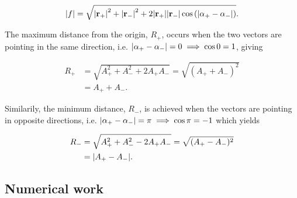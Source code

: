 \begin{equation}\label{eq:p3_magnitude_f}
    \abs{f} = \sqrt{\abs{\mathbf{r}_+}^2 + \abs{\mathbf{r}_-}^2 + 2\abs{\mathbf{r}_+}\abs{\mathbf{r_-}}\cos{(\abs{\alpha_+-\alpha_-})}}.
\end{equation}

The maximum distance from the origin, $R_+$, occurs when the two vectors are pointing in the same direction, i.e. $\abs{\alpha_+-\alpha_-} = 0 \implies \cos0=1$, giving 


\begin{align}
    R_+ &= \sqrt{A_+^2 + A_-^2 + 2A_+A_-} = \sqrt{(A_+ + A_-)^2}\nonumber \\
    &= A_+ + A_-. \label{eq:p4_Rplus}   
\end{align}

Similarily, the minimum distance, $R_-$, is achieved when the vectors are pointing in opposite directions, i.e. $\abs{\alpha_+-\alpha_-} = \pi \implies \cos\pi=-1$ which yields

 
\begin{align}
    R_- &= \sqrt{A_+^2 + A_-^2 - 2A_+A_-} = \sqrt{(A_+ - A_-)^2}\nonumber \\
    &= \abs{A_+ - A_-}. \label{eq:p4_Rminus}  
\end{align}











\subsection{ Numerical work}\label{sec:code}

